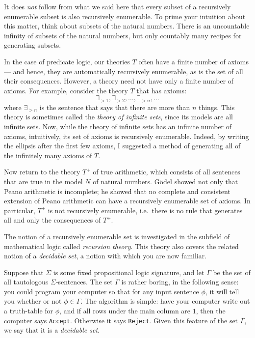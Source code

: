 It does {\it not} follow from what we said here that every subset of a
recursively enumerable subset is also recursively enumerable.  To
prime your intuition about this matter, think about subsets of the
natural numbers.  There is an uncountable infinity of subsets of the
natural numbers, but only countably many recipes for generating
subsets.

In the case of predicate logic, our theories $T$ often have a finite
number of axioms --- and hence, they are automatically recursively
enumerable, as is the set of all their consequences.  However, a
theory need not have only a finite number of axioms.  For example,
consider the theory $T$ that has axioms:
\[ \exists _{>1},\exists _{>2},\dots ,\exists _{>n},\dots \] where
$\exists _{>n}$ is the sentence that says that there are more than $n$
things.  This theory is sometimes called the \emph{theory of infinite
  sets}, since its models are all infinite sets.  Now, while the
theory of infinite sets has an infinite number of axioms, intuitively,
its set of axioms is recursively enumerable.  Indeed, by writing the
ellipsis after the first few axioms, I suggested a method of
generating all of the infinitely many axioms of $T$.

Now return to the theory $T^+$ of true arithmetic, which consists of
all sentences that are true in the model $N$ of natural numbers.
G{\"o}del showed not only that Peano arithmetic is incomplete; he
showed that no complete and consistent extension of Peano arithmetic
can have a recursively enumerable set of axioms.  In particular, $T^+$
is not recursively enumerable, i.e.\ there is no rule that generates
all and only the consequences of $T^+$.

The notion of a recursively enumerable set is investigated in the
subfield of mathematical logic called \emph{recursion theory}.  This
theory also covers the related notion of a \emph{decidable set}, a
notion with which you are now familiar.

Suppose that $\Sigma$ is some fixed propositional logic signature, and
let $\Gamma$ be the set of all tautologous $\Sigma$-sentences.  The
set $\Gamma$ is rather boring, in the following sense: you could
program your computer so that for any input sentence $\phi$, it will
tell you whether or not $\phi\in\Gamma$.  The algorithm is simple:
have your computer write out a truth-table for $\phi$, and if all rows
under the main column are $1$, then the computer says \texttt{Accept}.
Otherwise it says \texttt{Reject}.  Given this feature of the set
$\Gamma$, we say that it is a \emph{decidable set}.

